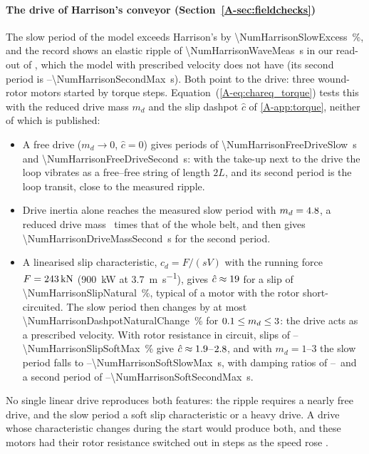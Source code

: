 \paragraph{The drive of Harrison's conveyor (Section~\ref{A-sec:fieldchecks})} The slow period of
the model exceeds Harrison's by \qty{\NumHarrisonSlowExcess}{\percent}, and the record shows an
elastic ripple of \qty{\NumHarrisonWaveMeas}{\second} in our read-out of
\citet[Fig.~5c]{harrison1983}, which the model with prescribed velocity does not have (its second
period is \NumHarrisonSecondMin--\qty{\NumHarrisonSecondMax}{\second}). Both point to the drive:
three wound-rotor motors started by torque steps. Equation~(\ref{A-eq:chareq_torque}) tests this
with the reduced drive mass $m_d$ and the slip dashpot $\hat c$ of \ref{A-app:torque},
neither of which is published:
\begin{itemize}
  \item A free drive ($m_d\to0$, $\hat c=0$) gives periods of
  \qty{\NumHarrisonFreeDriveSlow}{\second} and \qty{\NumHarrisonFreeDriveSecond}{\second}: with
  the take-up next to the drive the loop vibrates as a free--free string of length $2L$, and its
  second period is the loop transit, close to the measured ripple.
  \item Drive inertia alone reaches the measured slow period with $m_d=4.8$,
  a reduced drive mass \NumHarrisonDriveMassBeltRatio\ times that of the whole belt, and then gives
  \qty{\NumHarrisonDriveMassSecond}{\second} for the second period.
  \item A linearised slip characteristic, $c_d=F/(sV)$ with the running force
  $F=\qty{243}{\kilo\newton}$ (\qty{900}{\kilo\watt} at
  \qty{3.7}{\metre\per\second}), gives $\hat c\approx19$ for a slip of
  \qty{\NumHarrisonSlipNatural}{\percent}, typical of a motor with the rotor short-circuited. The
  slow period then changes by at most \qty{\NumHarrisonDashpotNaturalChange}{\percent} for
  $0.1\le m_d\le3$: the drive acts as a prescribed
  velocity. With rotor resistance in circuit, slips of
  \NumHarrisonSlipSoftMin--\qty{\NumHarrisonSlipSoftMax}{\percent} give
  $\hat c\approx1.9$--$2.8$, and with $m_d=1$--$3$
  the slow period falls to \NumHarrisonSoftSlowMin--\qty{\NumHarrisonSoftSlowMax}{\second}, with
  damping ratios of \NumHarrisonSoftZetaMin--\NumHarrisonSoftZetaMax\ and a second period of
  \NumHarrisonSoftSecondMin--\qty{\NumHarrisonSoftSecondMax}{\second}.
\end{itemize}
No single linear drive reproduces both features: the ripple requires a nearly free drive, and the
slow period a soft slip characteristic or a heavy drive. A drive whose characteristic changes
during the start would produce both, and these motors had their rotor resistance switched out in
steps as the speed rose \citep[Sect.~3]{harrison1985b}.

